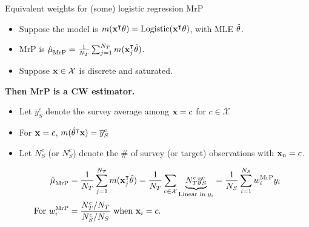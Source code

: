 \begin{frame}[t]{Equivalent weights for (some) logistic regression MrP}
%
\begin{itemize}
    \item Suppose the model is $m(\mathbf{x}^\intercal \theta) = \mathrm{Logistic}(\mathbf{x}^\intercal \theta)$, with MLE $\hat{\theta}$.
    \item MrP is $\hat{\mu}^{}_{\mathrm{MrP}} = \frac{1}{{N_T}} \sum_{j=1}^{N_T} m(\mathbf{x}_j^\intercal \hat{\theta})$.
    \item Suppose $\mathbf{x} \in \mathcal{X}$ is discrete and saturated.
\end{itemize}
%

\textbf{Then MrP is a CW estimator.}

\pause
\def\ybar{\overline{y}}
\def\Ntarc{N_T^c}
\def\Nsurc{N_S^c}
%
\begin{itemize}
    \item Let $\ybar_S^c$ denote the survey average among $\mathbf{x} = c$ for $c \in \mathcal{X}$
    \item For $\mathbf{x} = c$, $m(\thetahat^\trans \x) = \ybar_S^c$
    \item Let $\Nsurc$ (or $\Nsurc$) denote the \# of survey (or target) observations with $\mathbf{x}_n = c$.
\end{itemize}
%
$$
\begin{aligned}
\muhat_\mrp ={}& \meantar \m(\x_j^\trans \thetahat)
            = \frac{1}{\Ntar} \sum_{c \in \mathcal{X}}
            \underbrace{\Ntarc \ybar_S^c}_{\textrm{Linear in }\y_i}
        = \meansur \w_i^\mrp \y_i
\\ \textrm{For }
\w_i^\mrp ={}&
    \frac{\Ntarc / \Ntar}{\Nsurc / \Nsur} \textrm{ when }\x_i=c.
\end{aligned}
$$

\end{frame}



